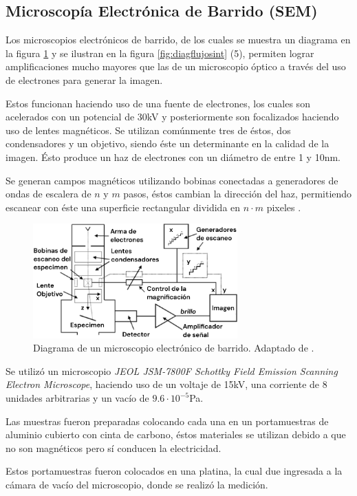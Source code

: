 \documentclass[../main.tex]{subfiles}
\begin{document}
\subsection{Microscopía Electrónica de Barrido (SEM)}
Los microscopios electrónicos de barrido, de los cuales se muestra un diagrama en la figura \ref{fig:semdiag} y se ilustran en la figura \ref{fig:diagflujosint} (5), permiten lograr amplificaciones mucho mayores que las de un microscopio óptico a través del uso de electrones para generar la imagen.

Estos funcionan haciendo uso de una fuente de electrones, los cuales son acelerados con un potencial de 30kV y posteriormente son focalizados haciendo uso de lentes magnéticos. Se utilizan comúnmente tres de éstos, dos condensadores y un objetivo, siendo éste un determinante en la calidad de la imagen. Ésto produce un haz de electrones con un diámetro de entre 1 y 10nm.

Se generan campos magnéticos utilizando bobinas conectadas a generadores de ondas de escalera de $n$ y $m$ pasos, éstos cambian la dirección del haz, permitiendo escanear con éste una superficie rectangular dividida en $n\cdot m$ pixeles \cite{Egerton2005}.
\begin{figure}[H]
    \centering
    \includegraphics[width=0.7\textwidth]{fig/semdiag.png}
    \caption{Diagrama de un microscopio electrónico	de barrido. Adaptado de \cite{Egerton2005}.}
    \label{fig:semdiag}
\end{figure}
Se utilizó un microscopio \textit{JEOL JSM-7800F Schottky Field Emission Scanning Electron Microscope}, haciendo uso de un voltaje de 15kV, una corriente de 8 unidades arbitrarias y un vacío de $9.6\cdot10^{-5}$Pa.

Las muestras fueron preparadas colocando cada una en un portamuestras de aluminio cubierto con cinta de carbono, éstos materiales se utilizan debido a que no son magnéticos pero sí conducen la electricidad.

Estos portamuestras fueron colocados en una platina, la cual due ingresada a la cámara de vacío del microscopio, donde se realizó la medición. 
\end{document}

